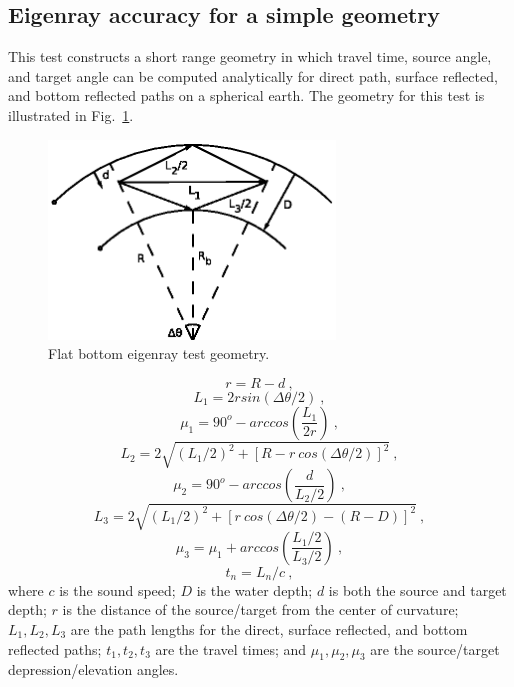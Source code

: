 \documentclass{ws-jca}
\begin{document}
\subsection{Eigenray accuracy for a simple geometry}

This test constructs a short range geometry in which travel time, source
angle, and target angle can be computed analytically for direct path,
surface reflected, and bottom reflected paths on a spherical earth. The
geometry for this test is illustrated in Fig.~\ref{fig:eigenray_basic}.
\begin{figure}[th]
	\centerline{\includegraphics[width=3in]{EigenrayBasic.eps}} 
	\vspace*{8pt}
	\caption{Flat bottom eigenray test geometry. 
	\label{fig:eigenray_basic}}
\end{figure}
\begin{equation}
	r = R - d \:,
	\label{eq:eigenray_flat_h}
\end{equation}
\begin{equation}
	L_1 = 2 r sin( \Delta \theta / 2 ) \:,
	\label{eq:eigenray_flat_L1}
\end{equation}
\begin{equation}
	\mu_1 = 90^o - arccos \left( \frac{L_1}{2r} \right) \:,
	\label{eq:eigenray_flat_mu1}
\end{equation}
\begin{equation}
	L_2 = 2 \sqrt{ (L_1/2)^2 + [R-r \: cos(\Delta \theta / 2)]^2 } \:,
	\label{eq:eigenray_flat_L2}
\end{equation}
\begin{equation}
	\mu_2 = 90^o - arccos \left( \frac{d}{L_2/2} \right) \:,
	\label{eq:eigenray_flat_mu2}
\end{equation}
\begin{equation}
	L_3 = 2 \sqrt{ (L_1/2)^2 + [r \: cos(\Delta \theta / 2) - (R-D)]^2 } \:,
	\label{eq:eigenray_flat_L3}
\end{equation}
\begin{equation}
	\mu_3 = \mu_1 + arccos \left( \frac{L_1/2}{L_3/2} \right) \:,
	\label{eq:eigenray_flat_mu3}
\end{equation}
\begin{equation}
	t_n = L_n / c \:,
	\label{eq:eigenray_flat_c}
\end{equation}
where
$c$ is the sound speed;
$D$ is the water depth;
$d$ is both the source and target depth;
$r$ is the distance of the source/target from the center of curvature; 
\( L_1, L_2, L_3 \) are the path lengths for the direct, surface reflected,
and bottom reflected paths;
\( t_1, t_2, t_3 \) are the travel times; and
\( \mu_1, \mu_2, \mu_3 \) are the source/target depression/elevation angles.
\end{document}
